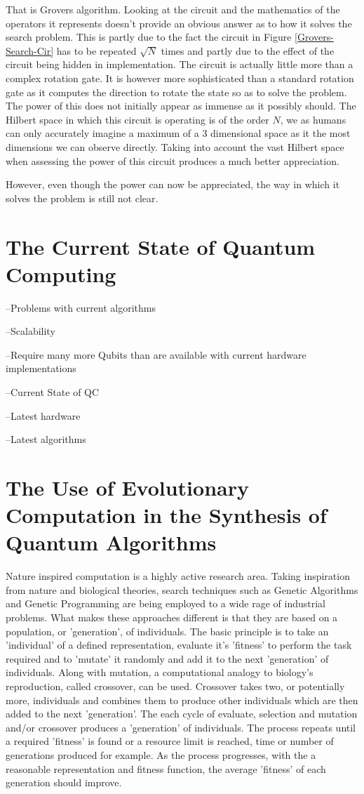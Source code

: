 \documentclass[authoryearcitations]{UoYCSproject}
\begin{document}
That is Grovers algorithm.
Looking at the circuit and the mathematics of the operators it represents doesn't provide an obvious answer as to how it solves the search problem.
This is partly due to the fact the circuit in Figure \ref{Grovers-Search-Cir} has to be repeated $\sqrt{N}$ times and partly due to the effect of the circuit being hidden in implementation.
The circuit is actually little more than a complex rotation gate.
It is however more sophisticated than a standard rotation gate as it computes the direction to rotate the state so as to solve the problem.
The power of this does not initially appear as immense as it possibly should.
The Hilbert space in which this circuit is operating is of the order $N$, we as humans can only accurately imagine a maximum of a $3$ dimensional space as it the most dimensions we can observe directly.
Taking into account the vast Hilbert space when assessing the power of this circuit produces a much better appreciation.

However, even though the power can now be appreciated, the way in which it solves the problem is still not clear. 

\section{The Current State of Quantum Computing}
--Problems with current algorithms

	--Scalability
	
	--Require many more Qubits than are available with current hardware implementations

 
--Current State of QC
	
	--Latest hardware
	
	--Latest algorithms

\section{The Use of Evolutionary Computation in the Synthesis of Quantum Algorithms}
Nature inspired computation is a highly active research area.
Taking inspiration from nature and biological theories, search techniques such as Genetic Algorithms and Genetic Programming are being employed to a wide rage of industrial problems.
What makes these approaches different is that they are based on a population, or 'generation', of individuals.
The basic principle is to take an 'individual' of a defined representation, evaluate it's 'fitness' to perform the task required and to 'mutate' it randomly and add it to the next 'generation' of individuals.
Along with mutation, a computational analogy to biology's reproduction, called crossover, can be used.
Crossover takes two, or potentially more, individuals and combines them to produce other individuals which are then added to the next 'generation'.
The each cycle of evaluate, selection and mutation and/or crossover produces a 'generation' of individuals.
The process repeats until a required 'fitness' is found or a resource limit is reached, time or number of generations produced for example.
As the process progresses, with the a reasonable representation and fitness function, the average 'fitness' of each generation should improve.
\end{document}
